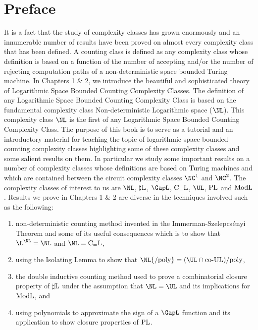 \documentclass{amsbook}
\theoremstyle{definition}
\theoremstyle{remark}
\numberwithin{section}{chapter}
\numberwithin{equation}{chapter}
\newcommand{\coUL}{\mbox{\rm co-UL}}
\newcommand{\NCone}{\ensuremath{\NC^1}}
\newcommand{\NCtwo}{\ensuremath{\NC^2}}
\newcommand{\sharpL}{\mbox{$\sharp$\rm L}}
\newcommand{\CeqL}{\mbox{\rm C$_=$L}}
\renewcommand{\PL}{\mbox{\rm PL}}
\newcommand{\ModL}{\mbox{\rm ModL}}
\newcommand{\NLpoly}{\mbox{\ensuremath{\NL{\rm /poly}}}}
\begin{document}
\cleardoublepage
\thispagestyle{empty}
\setcounter{page}{3}

\tableofcontents

\chapter*{Preface}
It is a fact that the study of complexity classes has grown enormously and an innumerable number of results have been proved on almost every complexity class that has been defined. A counting class is defined as any complexity class whose definition is based on a function of the number of accepting and/or the number of rejecting computation paths of a non-deterministic space bounded Turing machine. In Chapters 1 \& 2, we introduce the beautiful and sophisticated theory of Logarithmic Space Bounded Counting Complexity Classes. The definition of any Logarithmic Space Bounded Counting Complexity Class is based on the fundamental complexity class Non-deterministic Logarithmic space ($\NL$). This complexity class $\NL$ is the first of any Logarithmic Space Bounded Counting Complexity Class.  The purpose of this book is to serve as a tutorial and an introductory material for teaching the topic of logarithmic space bounded counting complexity classes highlighting some of these complexity classes and some salient results on them. In particular we study some important results on a number of complexity classes whose definitions are based on Turing machines and which are contained between the circuit complexity classes $\NCone$ and $\NCtwo$. The complexity classes of interest to us are $\NL$, $\sharpL$, $\GapL$, $\CeqL$, $\UL$, $\PL$ and $\ModL$. Results we prove in Chapters 1 \& 2 are diverse in the techniques involved such as the following:
\begin{enumerate}
\item non-deterministic counting method invented in the Immerman-Szelepcs$\rm\acute{e}$nyi Theorem and some of its useful consequences which is to show that $\L^{\rm \NL}=\NL$ and $\NL=\CeqL$,
\item using the Isolating Lemma to show that $\NLpoly =(\UL\cap\coUL ){\rm /poly}$,
\item the double inductive counting method used to prove a combinatorial closure property of $\sharpL$ under the assumption that $\NL =\UL$ and its implications for $\ModL$, and
\item using polynomials to approximate the sign of a $\GapL$ function and its application to show closure properties of $\PL$.
\end{enumerate}
\end{document}

